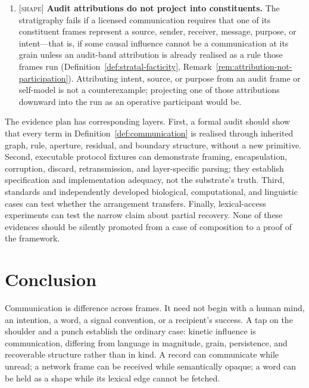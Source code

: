 \documentclass[11pt,a4paper]{article}
\theoremstyle{remark}\newtheorem{remark}[definition]{Remark}
\begin{document}
\begin{enumerate}[leftmargin=*]
rather than accumulating only additional frame-relative evidence. Attachments
(signatures, headers, return addresses, contextual cues) are paid evidence toward
a source, not proof of it (Remark~\ref{rem:attachments-evidence}); the account
also fails if any single attachment is shown to be, by itself, incorrigible
proof of provenance rather than forgeable, replayable, or convention-dependent
evidence.
\item \textsc{[shape]} \textbf{Audit attributions do not project into
constituents.} The stratigraphy fails if a licensed communication requires that
one of its constituent frames represent a source, sender, receiver, message,
purpose, or intent---that is, if some causal influence cannot be a communication
at its grain unless an audit-band attribution is already realised as a rule those
frames run (Definition~\ref{def:stratal-facticity},
Remark~\ref{rem:attribution-not-participation}). Attributing intent, source, or
purpose from an audit frame or self-model is not a counterexample; projecting one
of those attributions downward into the run as an operative participant would be.
\end{enumerate}

The evidence plan has corresponding layers. First, a formal audit should show
that every term in Definition~\ref{def:communication} is realised through
inherited graph, rule, aperture, residual, and boundary structure, without a new
primitive. Second, executable protocol fixtures can demonstrate framing,
encapsulation, corruption, discard, retransmission, and layer-specific parsing;
they establish specification and implementation adequacy, not the substrate's
truth. Third, standards and independently developed biological, computational,
and linguistic cases can test whether the arrangement transfers. Finally,
lexical-access experiments can test the narrow claim about partial recovery. None
of these evidences should be silently promoted from a case of composition to a
proof of the framework.

\section{Conclusion}\label{sec:conclusion}

Communication is difference across frames. It need not begin with a human mind,
an intention, a word, a signal convention, or a recipient's success. A tap on the
shoulder and a punch establish the ordinary case: kinetic influence is
communication, differing from language in magnitude, grain, persistence, and
recoverable structure rather than in kind. A record can communicate while unread;
a network frame can be received while semantically opaque; a word can be held as
a shape while its lexical edge cannot be fetched.
\end{document}
